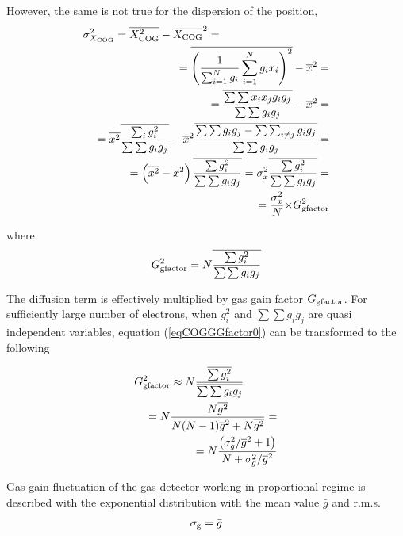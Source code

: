 \documentclass[a4paper,12pt]{article}
\begin{document}
However, the same is not true for the dispersion of the position,
\begin{eqnarray}
    \lefteqn{ \sigma^2_{X_{\rm{COG}}}
    =\overline{X_{\rm{COG}}^2}-\overline{X_{\rm{COG}}}^2=}\nonumber\\&&{}
    =\overline{\left(\frac{1}{\sum_{i=1}^N{g_i}}\sum_{i=1}^{N}{g_ix_i}
    \right)^2}-\overline{x}^2=
    \nonumber\\
    &&{}=\overline{\frac{{\sum\sum{x_ix_jg_ig_j}}}{{\sum\sum{g_ig_j}}}}-
    \overline{x}^2=
    \nonumber\\&&{}=
    \overline{x^2}\overline{\frac{\sum_i{g_i^2}}{\sum\sum{g_ig_j}}}-
    \overline{x}^2
    \overline{\frac{\sum\sum{g_ig_j}-\sum\sum_{i\ne{j}}{g_ig_j}}
    {\sum\sum{g_ig_j}}}= \nonumber\\&&
    =\left(\overline{x^2}-\overline{x}^2\right)
    \overline{\frac{\sum{g_i^2}}{\sum\sum{g_ig_j}}}=
    \sigma_x^2\overline{\frac{\sum{g_i^2}}{\sum\sum{g_ig_j}}}=
    \nonumber\\
    &&{}=\frac{\sigma_x^2}{N}{\times}G_{\rm{gfactor}}^2
\label{eqCOGSigmaGG}
\end{eqnarray}

where
\begin{eqnarray}
      G_{\rm{gfactor}}^2 = N\overline{\frac{\sum{g_i^2}}{\sum\sum{g_ig_j}}}
\label{eqCOGGGfactor0}
\end{eqnarray}

The diffusion term is effectively multiplied by gas gain factor
$G_{\rm{gfactor}}$. For sufficiently large number of electrons,
when $g_i^2$ and $\sum\sum{g_ig_j}$ are quasi independent
variables, equation (\ref{eqCOGGGfactor0}) can be transformed to
the following

\begin{eqnarray}
    \lefteqn{G_{\rm{gfactor}}^2 \approx
    N\frac{\overline{\sum{g_i^2}}}
    {\overline{\sum\sum{g_ig_j}}}}\nonumber\\
    &&{} =
    N\frac{N\overline{g^2}}{N(N-1)\overline{g}^2+N\overline{g^2}}=
    \nonumber\\
    &&{} =N\frac{ \left(\sigma_g^2/\overline{g}^2+1 \right)}
    {N+\sigma_g^2/\overline{g}^2}
\label{eqCOGGGfactorE}
\end{eqnarray}

Gas gain fluctuation of the gas detector working in proportional
regime is described with the exponential distribution with the
mean value $\bar{g}$ and r.m.s.
\begin{eqnarray}
        \sigma_{\rm{g}} =\bar{g}
\label{eqSigmaexp}
\end{eqnarray}
\end{document}
